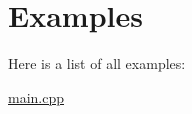 \section{Examples}
Here is a list of all examples\+:\begin{DoxyCompactItemize}
\item 
\mbox{\hyperlink{main_8cpp-example}{main.\+cpp}}
\end{DoxyCompactItemize}
